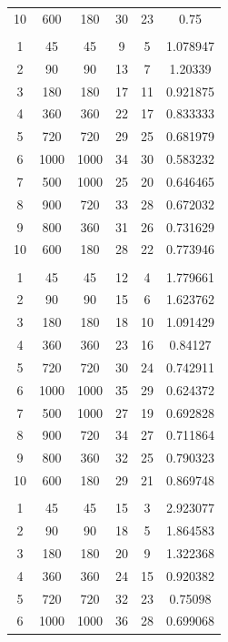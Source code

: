 \documentclass[10pt]{article}
\begin{document}
\begin{table}[H]
\begin{tabular}{cccccc}
        10 & 600  & 180  & 30 & 23 & 0.75 \\
           &      &      &    &    & \\
        1  & 45   & 45   & 9  & 5  & 1.078947 \\
        2  & 90   & 90   & 13 & 7  & 1.20339 \\
        3  & 180  & 180  & 17 & 11 & 0.921875 \\
        4  & 360  & 360  & 22 & 17 & 0.833333 \\
        5  & 720  & 720  & 29 & 25 & 0.681979 \\
        6  & 1000 & 1000 & 34 & 30 & 0.583232 \\
        7  & 500  & 1000 & 25 & 20 & 0.646465 \\
        8  & 900  & 720  & 33 & 28 & 0.672032 \\
        9  & 800  & 360  & 31 & 26 & 0.731629 \\
        10 & 600  & 180  & 28 & 22 & 0.773946 \\
           &      &      &    &    & \\
        1  & 45   & 45   & 12 & 4  & 1.779661 \\
        2  & 90   & 90   & 15 & 6  & 1.623762 \\
        3  & 180  & 180  & 18 & 10 & 1.091429 \\
        4  & 360  & 360  & 23 & 16 & 0.84127 \\
        5  & 720  & 720  & 30 & 24 & 0.742911 \\
        6  & 1000 & 1000 & 35 & 29 & 0.624372 \\
        7  & 500  & 1000 & 27 & 19 & 0.692828 \\
        8  & 900  & 720  & 34 & 27 & 0.711864 \\
        9  & 800  & 360  & 32 & 25 & 0.790323 \\
        10 & 600  & 180  & 29 & 21 & 0.869748 \\
           &      &      &    &    & \\
        1  & 45   & 45   & 15 & 3  & 2.923077 \\
        2  & 90   & 90   & 18 & 5  & 1.864583 \\
        3  & 180  & 180  & 20 & 9  & 1.322368 \\
        4  & 360  & 360  & 24 & 15 & 0.920382 \\
        5  & 720  & 720  & 32 & 23 & 0.75098 \\
        6  & 1000 & 1000 & 36 & 28 & 0.699068 \\

\end{tabular}
\end{table}
\end{document}
